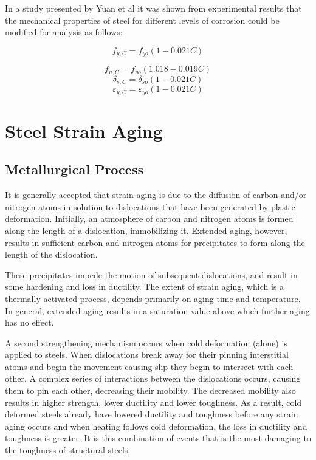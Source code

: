 In a study presented by Yuan et al \cite{Yuan2000} it was shown from experimental results that the mechanical properties of steel for different levels of corrosion could be modified for analysis as follows:

\begin{equation}
  f_{y,C}=f_{yo}(1-0.021C)
  \label{eq.eight}
\end{equation} 

\[
  f_{u,C}=f_{yo}(1.018-0.019C)
\]
\[
  \delta_{s,C}=\delta_{so}(1-0.021C)
\]
\[
  \varepsilon_{y,C}=\varepsilon_{yo}(1-0.021C)
\]

\section{Steel Strain Aging}

\subsection{Metallurgical Process}

It is generally accepted that strain aging is due to the diffusion of carbon and/or nitrogen atoms in solution to dislocations that have been generated by plastic deformation. Initially, an atmosphere of carbon and nitrogen atoms is formed along the length of a dislocation, immobilizing it. Extended aging, however, results in sufficient carbon and nitrogen atoms for precipitates to form along the length of the dislocation.

These precipitates impede the motion of subsequent dislocations, and result in some hardening and loss in ductility. The extent of strain aging, which is a thermally activated process, depends primarily on aging time and temperature. In general, extended aging results in a saturation value above which further aging has no effect.

A second strengthening mechanism occurs when cold deformation (alone) is applied to steels. When dislocations break away for their pinning interstitial atoms and begin the movement causing slip they begin to intersect with each other. A complex series of interactions between the dislocations occurs, causing them to pin each other, decreasing their mobility. The decreased mobility also results in higher strength, lower ductility and lower toughness. As a result, cold deformed steels already have lowered ductility and toughness before any strain aging occurs and when heating follows cold deformation, the loss in ductility and toughness is greater. It is this combination of events that is the most damaging to the toughness of structural steels.

